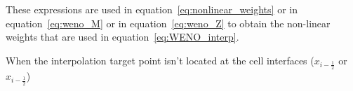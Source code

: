 These expressions are used in equation~\ref{eq:nonlinear_weights} or in equation~\ref{eq:weno_M} or in equation~\ref{eq:weno_Z} to obtain the non-linear weights that are used in equation~\ref{eq:WENO_interp}.

When the interpolation target point isn't located at the cell interfaces ($x_{i-\frac{1}{2}}$ or $x_{i-\frac{1}{2}}$)
